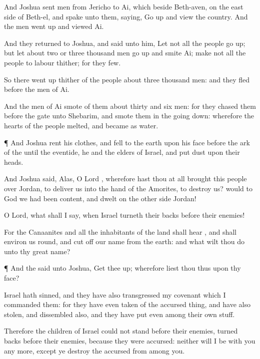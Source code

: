 {And
Joshua
sent
men from
Jericho to
Ai, which
{}
beside
Beth-aven, on the east
side of
Beth-el, and
spake unto them,
saying, Go
up and
view the
country. And the
men went
up and
viewed
Ai.

And they
returned to
Joshua, and
said unto him, Let not all the
people go
up; but let about two or
three
thousand
men go
up and
smite
Ai;
{} make not all the
people to
labour thither; for they
{}
few.

So there went
up thither of the
people about
three
thousand
men: and they
fled
before the
men of
Ai.

And the
men of
Ai
smote of them about
thirty and
six
men: for they
chased them
{}
before the
gate
{} unto
Shebarim, and
smote them in the going
down: wherefore the
hearts of the
people
melted, and became as
water.


\par }{\PP {}¶ And
Joshua
rent his
clothes, and
fell to the
earth upon his
face
before the
ark of the
{} until the
eventide, he and the
elders of
Israel, and
put
dust upon their
heads.

And
Joshua
said, Alas,
O
Lord
{}, wherefore hast thou at
all
brought this
people
over
Jordan, to
deliver us into the
hand of the
Amorites, to
destroy us? would to
God we had been
content, and
dwelt on the other
side
Jordan!

O
Lord, what shall I
say,
when
Israel
turneth their
backs
before their
enemies!

For the
Canaanites and all the
inhabitants of the
land shall
hear
{}, and shall environ us
round, and cut
off our
name from the
earth: and what wilt thou
do unto thy
great
name?


\par }{\PP {}¶ And the
{}
said unto
Joshua, Get thee
up; wherefore
liest thou thus upon thy
face?

Israel hath
sinned, and they have also
transgressed my
covenant which I
commanded them: for they have even
taken of the accursed
thing, and have also
stolen, and
dissembled also, and they have
put
{} even among their own
stuff.

Therefore the
children of
Israel
could not
stand
before their
enemies,
{}
turned
{}
backs
before their
enemies, because they were
accursed: neither will I be with you any
more,
except ye
destroy the
accursed from
among you.

}
